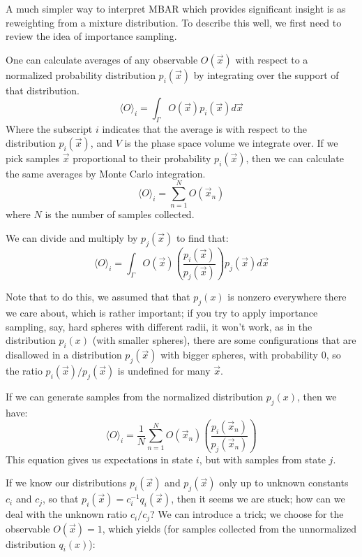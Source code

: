 \documentclass[aps,pre,twocolumn,superscriptaddress]{revtex4-1}
\begin{document}
A much simpler way to interpret MBAR which provides significant
insight is as reweighting from a mixture distribution. To describe
this well, we first need to review the idea of importance sampling.

One can calculate averages of any observable $O(\vec{x})$ with respect
to a normalized probability distribution $p_i(\vec{x})$ by integrating over the
support of that distribution.
\[ \langle O \rangle_{i} = \int_{\Gamma} O(\vec{x}) p_i(\vec{x}) d\vec{x}\]
Where the subscript $i$ indicates that the average is with respect
to the distribution $p_i(\vec{x})$, and $V$ is the phase space volume
we integrate over. If we pick samples $\vec{x}$ proportional to their
probability $p_i(\vec{x})$, then we can calculate the same averages by
Monte Carlo integration.
\[ \langle O \rangle_{i} = \sum_{n=1}^{N} O(\vec{x}_n) \]
where $N$ is the number of samples collected.

We can divide and multiply by $p_j(\vec{x})$ to find that:
\[ \langle O \rangle_{i} = \int_{\Gamma} O(\vec{x}) \left(\frac{p_i(\vec{x})}{p_j(\vec{x})}\right) p_j(\vec{x}) d\vec{x}\]

Note that to do this, we assumed that that $p_j(x)$ is nonzero
everywhere there we care about, which is rather important; if you try
to apply importance sampling, say, hard spheres with different radii,
it won't work, as in the distribution $p_i(x)$ (with smaller spheres),
there are some configurations that are disallowed in a distribution
$p_j(\vec{x})$ with bigger spheres, with probability 0, so the ratio
$p_i(\vec{x})/p_j(\vec{x})$ is undefined for many $\vec{x}$.

If we can generate samples from the normalized distribution $p_j(x)$,
then we have:
\[ \langle O \rangle_{i} = \frac{1}{N} \sum_{n=1}^N O(\vec{x}_n) \left(\frac{p_i(\vec{x}_n)}{p_j(\vec{x}_n)}\right) \] 
This equation gives us expectations in state $i$, but with samples
from state $j$.

If we know our distributions $p_i(\vec{x})$ and $p_j(\vec{x})$ only up
to unknown constants $c_i$ and $c_j$, so that $p_i(\vec{x}) =
c_i^{-1}q_i(\vec{x})$, then it seems we are stuck; how can we deal
with the unknown ratio $c_i/c_j$? We can introduce a trick; we choose
for the observable $O(\vec{x})=1$, which yields (for samples collected
from the unnormalized distribution $q_i(x)$):
\end{document}
